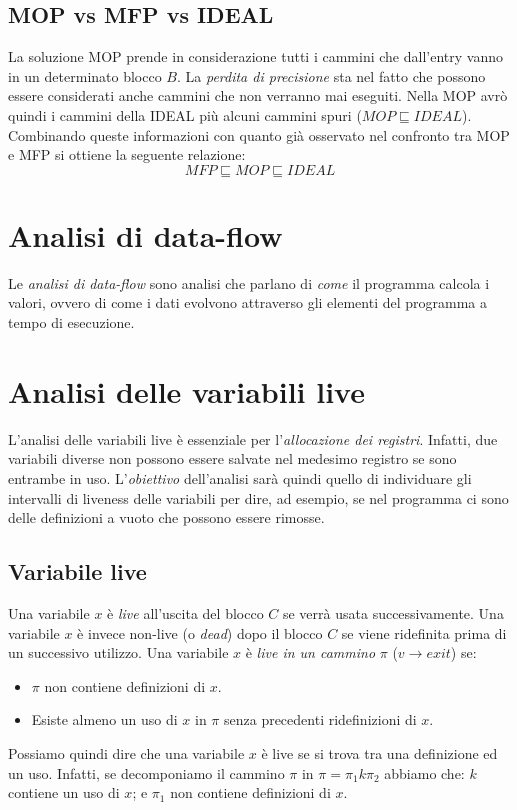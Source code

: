 \documentclass[a4paper,oneside,titlepage]{book}
\begin{document}
\subsection{MOP vs MFP vs IDEAL}
La soluzione MOP prende in considerazione tutti i cammini che dall'entry vanno in un determinato blocco $B$. La \textit{perdita di precisione} sta nel fatto che possono essere considerati anche cammini che non verranno mai eseguiti. Nella MOP avrò quindi i cammini della IDEAL più alcuni cammini spuri ($MOP \sqsubseteq IDEAL$). Combinando queste informazioni con quanto già osservato nel confronto tra MOP e MFP si ottiene la seguente relazione:
\[ MFP \sqsubseteq MOP \sqsubseteq IDEAL \]


\section{Analisi di data-flow} %
Le \textit{analisi di data-flow} sono analisi che parlano di \textit{come} il programma calcola i valori, ovvero di come i dati evolvono attraverso gli elementi del programma a tempo di esecuzione.


\section{Analisi delle variabili live} %
\label{live1}
L'analisi delle variabili live è essenziale per l'\textit{allocazione dei registri}. Infatti, due variabili diverse non possono essere salvate nel medesimo registro se sono entrambe in uso. L'\textit{obiettivo} dell'analisi sarà quindi quello di individuare gli intervalli di liveness delle variabili per dire, ad esempio, se nel programma ci sono delle definizioni a vuoto che possono essere rimosse.

\subsection{Variabile live}
Una variabile $x$ è \textit{live} all'uscita del blocco $C$ se verrà usata successivamente. Una variabile $x$ è invece non-live (o \textit{dead}) dopo il blocco $C$ se viene ridefinita prima di un successivo utilizzo. Una variabile $x$ è \textit{live in un cammino} $\pi$ ($v \rightarrow exit$) se:
\begin{itemize}
    \item $\pi$ non contiene definizioni di $x$.
    \item Esiste almeno un uso di $x$ in $\pi$ senza precedenti ridefinizioni di $x$.
\end{itemize}
Possiamo quindi dire che una variabile $x$ è live se si trova tra una definizione ed un uso. Infatti, se decomponiamo il cammino $\pi$ in $\pi = \pi_1 k \pi_2$ abbiamo che: $k$ contiene un uso di $x$; e $\pi_1$ non contiene definizioni di $x$.
\end{document}

